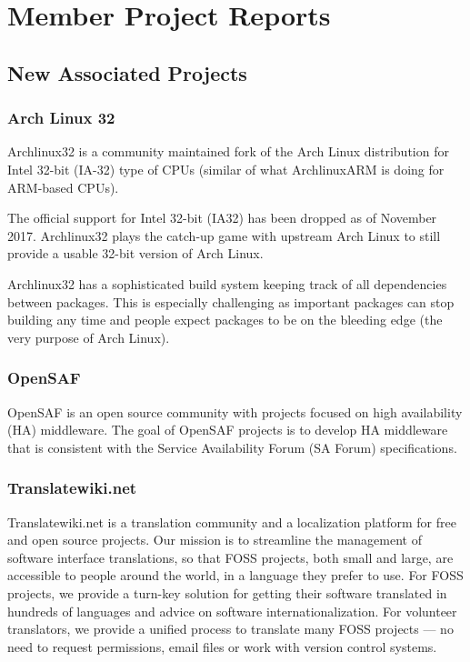 \documentclass[a4paper]{report}
\begin{document}
\chapter{Member Project Reports}

\section{New Associated Projects}

\subsection{Arch Linux 32}

Archlinux32 is a community maintained fork of the Arch Linux
distribution for Intel 32-bit (IA-32) type of CPUs (similar of what
ArchlinuxARM is doing for ARM-based CPUs).

The official support for Intel 32-bit (IA32) has been dropped as of
November 2017.  Archlinux32 plays the catch-up game with upstream Arch
Linux to still provide a usable 32-bit version of Arch Linux.

Archlinux32 has a sophisticated build system keeping track of all
dependencies between packages.  This is especially challenging as
important packages can stop building any time and people expect packages
to be on the bleeding edge (the very purpose of Arch Linux).

\subsection{OpenSAF}

OpenSAF is an open source community with projects focused on high
availability (HA) middleware.  The goal of OpenSAF projects is to
develop HA middleware that is consistent with the Service Availability
Forum (SA Forum) specifications.

\subsection{Translatewiki.net}

Translatewiki.net is a translation community and a localization platform
for free and open source projects. Our mission is to streamline the
management of software interface translations, so that FOSS projects,
both small and large, are accessible to people around the world, in a
language they prefer to use. For FOSS projects, we provide a turn-key
solution for getting their software translated in hundreds of languages
and advice on software internationalization. For volunteer translators,
we provide a unified process to translate many FOSS projects ---  no
need to request permissions, email files or work with version control
systems.
\end{document}
